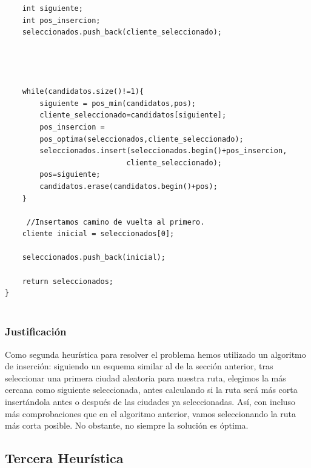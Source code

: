 \documentclass[a4paper,12pt,twoside]{article} %
\begin{document}
\begin{lstlisting}
    int siguiente;
    int pos_insercion;
    seleccionados.push_back(cliente_seleccionado);




    while(candidatos.size()!=1){
        siguiente = pos_min(candidatos,pos);
        cliente_seleccionado=candidatos[siguiente];
        pos_insercion = 
        pos_optima(seleccionados,cliente_seleccionado);
        seleccionados.insert(seleccionados.begin()+pos_insercion,
                            cliente_seleccionado);
        pos=siguiente;
        candidatos.erase(candidatos.begin()+pos);
    }
    
     //Insertamos camino de vuelta al primero.
    cliente inicial = seleccionados[0];

    seleccionados.push_back(inicial);

    return seleccionados;
}


\end{lstlisting}
\vspace{1cm}

\subsubsection{Justificación}
Como segunda heurística para resolver el problema hemos utilizado un algoritmo de inserción: siguiendo un esquema similar al de la sección anterior, tras seleccionar una primera ciudad aleatoria para nuestra ruta, elegimos la más cercana como siguiente seleccionada, antes calculando si la ruta será más corta insertándola antes o después de las ciudades ya seleccionadas. Así, con incluso más comprobaciones que en el algoritmo anterior, vamos seleccionando la ruta más corta posible. No obstante, no siempre la solución es óptima.
\newpage
\subsection{Tercera Heurística}
\end{document}
